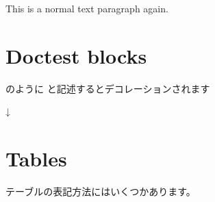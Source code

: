 \documentclass[letterpaper,10pt,dvipdfmx,openany,oneside]{sphinxmanual}
\begin{document}
This is a normal text paragraph again.


\section{Doctest blocks}
\label{\detokenize{1.chapter/basic_syntax:doctest-blocks}}
%
\begin{sphinxVerbatim}[commandchars=\\\{\}]
  
\end{sphinxVerbatim}

のように \sphinxstylestrong{\textgreater{}\textgreater{}\textgreater{}} と記述するとデコレーションされます

↓

%
\begin{sphinxVerbatim}[commandchars=\\\{\}]
  
\end{sphinxVerbatim}


\section{Tables}
\label{\detokenize{1.chapter/basic_syntax:tables}}
テーブルの表記方法にはいくつかあります。
\end{document}
